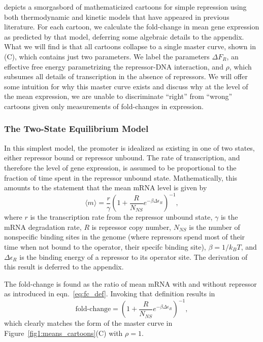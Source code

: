  depicts a smorgasbord of mathematicized cartoons for
simple repression using both thermodynamic and kinetic models  that have appeared in previous literature. For each cartoon,
we calculate the fold-change in mean gene expression as predicted by that model,
deferring some algebraic details to the appendix. What we will find is that all
cartoons collapse to a single master curve, shown in (C),
which contains just two parameters. We label the parameters $\Delta F_R$, an
effective free energy parametrizing the repressor-DNA interaction, and $\rho$,
which subsumes all details of transcription in the absence of repressors. We
will offer some intuition for why this master curve exists and discuss why at the level of
the mean expression, we are unable   to discriminate ``right'' from ``wrong'' cartoons given only
measurements of fold-changes in expression.

\subsubsection{The Two-State Equilibrium Model}
In this simplest model, the promoter is idealized as existing in one of two
states, either repressor bound or repressor unbound. The rate of transcription,
and therefore the level of gene expression, is assumed to be proportional to the
fraction of time spent in the repressor unbound state. Mathematically, this
amounts to the statement that the mean mRNA level is given by
\begin{equation}
\langle m \rangle = \frac{r}{\gamma}
        \left(1 + \frac{R}{N_{NS}} e^{-\beta\Delta\epsilon_R}\right)^{-1},
\end{equation}
where $r$ is the transcription rate from the repressor unbound state, $\gamma$
is the mRNA degradation rate, $R$ is repressor copy number, $N_{NS}$ is the
number of nonspecific binding sites in the genome (where repressors spend most
of their time when not bound to the operator, their specifc binding site),
$\beta=1/k_BT$, and $\Delta\epsilon_R$ is the binding energy of a repressor to
its operator site. The derivation of this result is deferred to the appendix.

The fold-change is  found as the ratio of mean mRNA with and without
repressor as introduced in eqn.~\ref{eq:fc_def}. Invoking that definition results in
\begin{equation}
\text{fold-change}
= \left(1 + \frac{R}{N_{NS}} e^{-\beta\Delta\epsilon_R}\right)^{-1},
\end{equation}
which clearly matches the form of the master curve in Figure~\ref{fig1:means_cartoons}(C)
with $\rho=1$.

